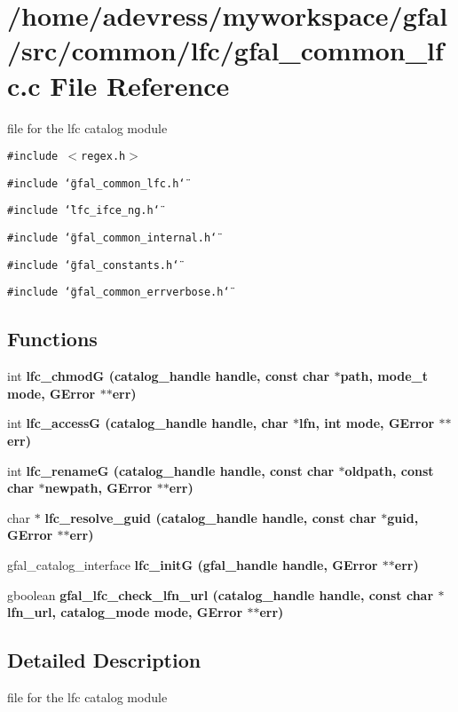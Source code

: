 \section{/home/adevress/myworkspace/gfal/src/common/lfc/gfal\_\-common\_\-lfc.c File Reference}
\label{gfal__common__lfc_8c}
file for the lfc catalog module 

{\tt \#include $<$regex.h$>$}\par
{\tt \#include \char`\"{}gfal\_\-common\_\-lfc.h\char`\"{}}\par
{\tt \#include \char`\"{}lfc\_\-ifce\_\-ng.h\char`\"{}}\par
{\tt \#include \char`\"{}gfal\_\-common\_\-internal.h\char`\"{}}\par
{\tt \#include \char`\"{}gfal\_\-constants.h\char`\"{}}\par
{\tt \#include \char`\"{}gfal\_\-common\_\-errverbose.h\char`\"{}}\par
\subsection*{Functions}
\begin{CompactItemize}
\item 
int \bf{lfc\_\-chmod\-G} (catalog\_\-handle handle, const char $\ast$path, mode\_\-t mode, GError $\ast$$\ast$err)
\item 
int \bf{lfc\_\-access\-G} (catalog\_\-handle handle, char $\ast$lfn, int mode, GError $\ast$$\ast$err)
\item 
int \bf{lfc\_\-rename\-G} (catalog\_\-handle handle, const char $\ast$oldpath, const char $\ast$newpath, GError $\ast$$\ast$err)
\item 
char $\ast$ \bf{lfc\_\-resolve\_\-guid} (catalog\_\-handle handle, const char $\ast$guid, GError $\ast$$\ast$err)
\item 
gfal\_\-catalog\_\-interface \bf{lfc\_\-init\-G} (gfal\_\-handle handle, GError $\ast$$\ast$err)
\item 
gboolean \bf{gfal\_\-lfc\_\-check\_\-lfn\_\-url} (catalog\_\-handle handle, const char $\ast$lfn\_\-url, catalog\_\-mode mode, GError $\ast$$\ast$err)
\end{CompactItemize}


\subsection{Detailed Description}
file for the lfc catalog module 

